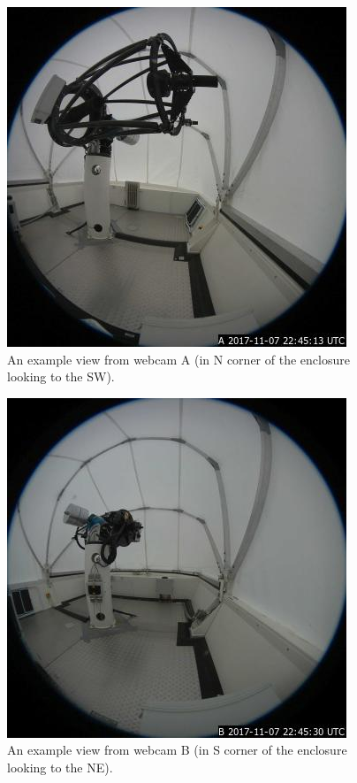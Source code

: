 \begin{figure}
\begin{center}
\includegraphics[width=0.8\linewidth]{figures/interface-coatli-webcam-a.jpg}
\end{center}
\caption{An example view from webcam A (in N corner of the enclosure looking to the SW).}
\label{figure:interface-webcam-a}
\end{figure}

\begin{figure}
\begin{center}
\includegraphics[width=0.8\linewidth]{figures/interface-coatli-webcam-b.jpg}
\end{center}
\caption{An example view from webcam B (in S corner of the enclosure looking to the NE).}
\label{figure:interface-webcam-b}
\end{figure}

